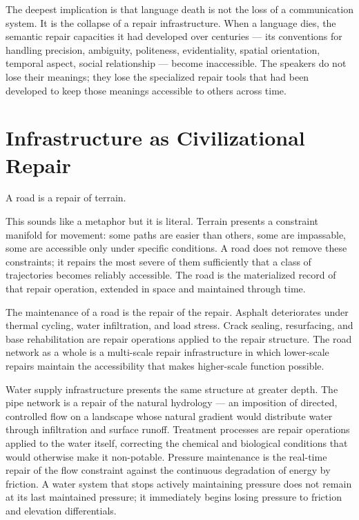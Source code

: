 \documentclass[11pt, a4paper]{article}
\theoremstyle{definition}
\theoremstyle{remark}
\begin{document}
The deepest implication is that language death is not the loss of a communication
system. It is the collapse of a repair infrastructure. When a language dies, the
semantic repair capacities it had developed over centuries --- its conventions for
handling precision, ambiguity, politeness, evidentiality, spatial orientation,
temporal aspect, social relationship --- become inaccessible. The speakers do
not lose their meanings; they lose the specialized repair tools that had been
developed to keep those meanings accessible to others across time.

\section{Infrastructure as Civilizational Repair}

A road is a repair of terrain.

This sounds like a metaphor but it is literal. Terrain presents a constraint
manifold for movement: some paths are easier than others, some are impassable,
some are accessible only under specific conditions. A road does not remove these
constraints; it repairs the most severe of them sufficiently that a class of
trajectories becomes reliably accessible. The road is the materialized record of
that repair operation, extended in space and maintained through time.

The maintenance of a road is the repair of the repair. Asphalt deteriorates
under thermal cycling, water infiltration, and load stress. Crack sealing,
resurfacing, and base rehabilitation are repair operations applied to the repair
structure. The road network as a whole is a multi-scale repair infrastructure in
which lower-scale repairs maintain the accessibility that makes higher-scale
function possible.

Water supply infrastructure presents the same structure at greater depth. The
pipe network is a repair of the natural hydrology --- an imposition of directed,
controlled flow on a landscape whose natural gradient would distribute water
through infiltration and surface runoff. Treatment processes are repair
operations applied to the water itself, correcting the chemical and biological
conditions that would otherwise make it non-potable. Pressure maintenance is
the real-time repair of the flow constraint against the continuous degradation
of energy by friction. A water system that stops actively maintaining pressure
does not remain at its last maintained pressure; it immediately begins losing
pressure to friction and elevation differentials.
\end{document}
